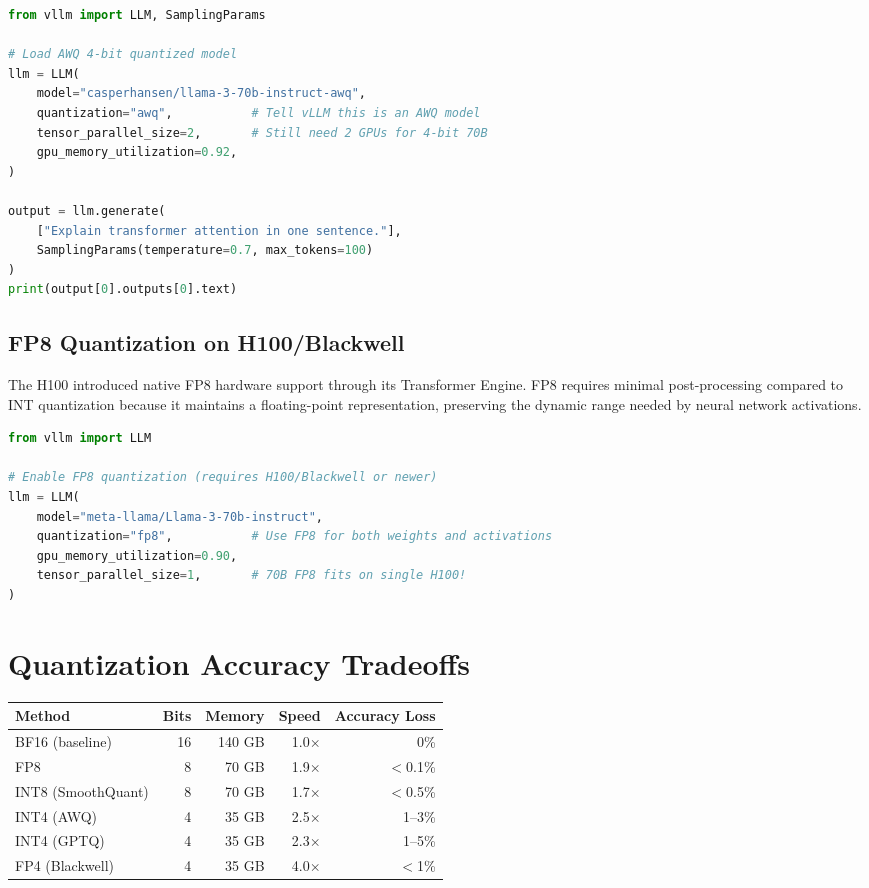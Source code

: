 \documentclass[11pt, twoside, openright]{book}
\begin{document}
\begin{lstlisting}[language=Python, caption={Using vLLM with AWQ quantized model}]
from vllm import LLM, SamplingParams

# Load AWQ 4-bit quantized model
llm = LLM(
    model="casperhansen/llama-3-70b-instruct-awq",
    quantization="awq",           # Tell vLLM this is an AWQ model
    tensor_parallel_size=2,       # Still need 2 GPUs for 4-bit 70B
    gpu_memory_utilization=0.92,
)

output = llm.generate(
    ["Explain transformer attention in one sentence."],
    SamplingParams(temperature=0.7, max_tokens=100)
)
print(output[0].outputs[0].text)
\end{lstlisting}

\subsection{FP8 Quantization on H100/Blackwell}

The H100 introduced native FP8 hardware support through its Transformer Engine.
FP8 requires minimal post-processing compared to INT quantization because it
maintains a floating-point representation, preserving the dynamic range needed
by neural network activations.

\begin{lstlisting}[language=Python, caption={FP8 inference with vLLM}]
from vllm import LLM

# Enable FP8 quantization (requires H100/Blackwell or newer)
llm = LLM(
    model="meta-llama/Llama-3-70b-instruct",
    quantization="fp8",           # Use FP8 for both weights and activations
    gpu_memory_utilization=0.90,
    tensor_parallel_size=1,       # 70B FP8 fits on single H100!
)
\end{lstlisting}

\section{Quantization Accuracy Tradeoffs}

\begin{center}
\begin{tabular}{lrrrr}
  \toprule
  \textbf{Method} & \textbf{Bits} & \textbf{Memory} & \textbf{Speed} &
  \textbf{Accuracy Loss} \\
  \midrule
  BF16 (baseline) & 16 & 140 GB & 1.0$\times$ & 0\% \\
  FP8 & 8 & 70 GB & 1.9$\times$ & $<$0.1\% \\
  INT8 (SmoothQuant) & 8 & 70 GB & 1.7$\times$ & $<$0.5\% \\
  INT4 (AWQ) & 4 & 35 GB & 2.5$\times$ & 1--3\% \\
  INT4 (GPTQ) & 4 & 35 GB & 2.3$\times$ & 1--5\% \\
  FP4 (Blackwell) & 4 & 35 GB & 4.0$\times$ & $<$1\% \\
  \bottomrule
\end{tabular}
\end{center}
\end{document}
